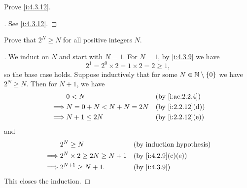 \begin{ex}\label{i:ex:4.3.4}
  Prove \cref{i:4.3.12}.
\end{ex}

\begin{proof}[]
  See \cref{i:4.3.12}.
\end{proof}

\begin{ex}\label{i:ex:4.3.5}
  Prove that \(2^N \geq N\) for all positive integers \(N\).
\end{ex}

\begin{proof}[]
  We induct on \(N\) and start with \(N = 1\).
  For \(N = 1\), by \cref{i:4.3.9} we have
  \[
    2^1 = 2^0 \times 2 = 1 \times 2 = 2 \geq 1,
  \]
  so the base case holds.
  Suppose inductively that for some \(N \in \mathbb{N} \setminus \left\lbrace0\right\rbrace\) we have \(2^N \geq N\).
  Then for \(N + 1\), we have
  \begin{align*}
             & 0 < N                  &  & \by{i:ac:2.2.4}  \\
    \implies & N = 0 + N < N + N = 2N &  & \by{i:2.2.12}[d] \\
    \implies & N + 1 \leq 2N          &  & \by{i:2.2.12}[e]
  \end{align*}
  and
  \begin{align*}
             & 2^N \geq N                      &  & \byIH             \\
    \implies & 2^N \times 2 \geq 2N \geq N + 1 &  & \by{i:4.2.9}[c,e] \\
    \implies & 2^{N + 1} \geq N + 1.           &  & \by{i:4.3.9}
  \end{align*}
  This closes the induction.
\end{proof}
